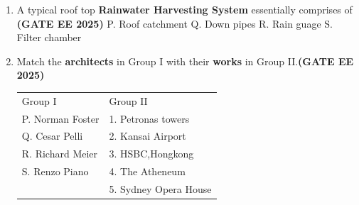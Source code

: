 \documentclass[journal,12pt,onecolumn]{IEEEtran}
\theoremstyle{remark}
\begin{document}
\begin{enumerate}
\begin{enumerate}
\end{enumerate}
\item A typical roof top \textbf{Rainwater Harvesting System} essentially comprises of \hfill \textbf{(GATE EE 2025)}
\newline
P. Roof catchment
\newline
Q. Down pipes
\newline
R. Rain guage
\newline
S. Filter chamber
\newline
\begin{enumerate}
\end{enumerate}
\item Match the \textbf{architects} in Group I with their \textbf{works} in Group II.\hfill \textbf{(GATE EE 2025)}
\newline
\begin{tabular}{p{}p{}}
Group I     & Group II \\
P. Norman Foster     & 1. Petronas towers\\
Q. Cesar Pelli & 2. Kansai Airport\\
R. Richard Meier & 3. HSBC,Hongkong\\
S. Renzo Piano & 4. The Atheneum\\
  & 5. Sydney Opera House\\
\end{tabular}
\begin{enumerate}
\end{enumerate}
  

\end{enumerate}
\end{document}
